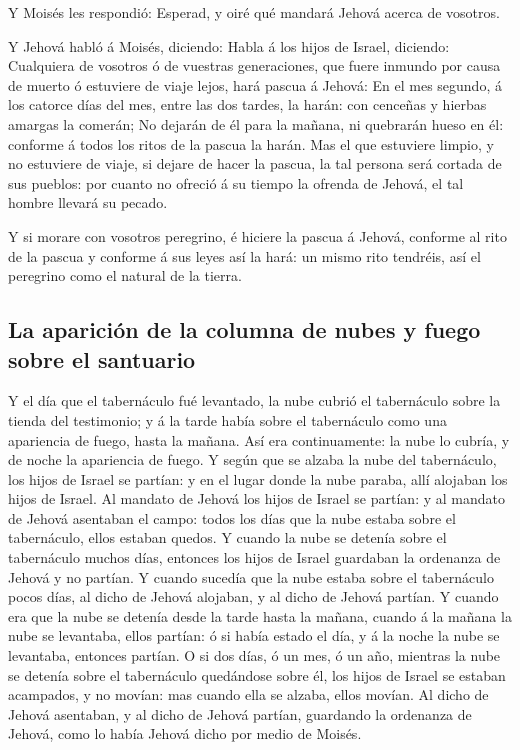  Y Moisés les respondió: Esperad, y oiré qué mandará Jehová
acerca de vosotros.

 Y Jehová habló á Moisés, diciendo:  Habla á
los hijos de Israel, diciendo: Cualquiera de vosotros ó de vuestras
generaciones, que fuere inmundo por causa de muerto ó estuviere de viaje
lejos, hará pascua á Jehová:  En el mes segundo, á los
catorce días del mes, entre las dos tardes, la harán: con cenceñas y
hierbas amargas la comerán;  No dejarán de él para la
mañana, ni quebrarán hueso en él: conforme á todos los ritos de la
pascua la harán.  Mas el que estuviere limpio, y no
estuviere de viaje, si dejare de hacer la pascua, la tal persona será
cortada de sus pueblos: por cuanto no ofreció á su tiempo la ofrenda de
Jehová, el tal hombre llevará su pecado.

 Y si morare con vosotros peregrino, é hiciere la pascua á
Jehová, conforme al rito de la pascua y conforme á sus leyes así la
hará: un mismo rito tendréis, así el peregrino como el natural de la
tierra.

\hypertarget{la-apariciuxf3n-de-la-columna-de-nubes-y-fuego-sobre-el-santuario}{%
\subsection{La aparición de la columna de nubes y fuego sobre el
santuario}\label{la-apariciuxf3n-de-la-columna-de-nubes-y-fuego-sobre-el-santuario}}

 Y el día que el tabernáculo fué levantado, la nube cubrió
el tabernáculo sobre la tienda del testimonio; y á la tarde había sobre
el tabernáculo como una apariencia de fuego, hasta la mañana.
 Así era continuamente: la nube lo cubría, y de noche la
apariencia de fuego.  Y según que se alzaba la nube del
tabernáculo, los hijos de Israel se partían: y en el lugar donde la nube
paraba, allí alojaban los hijos de Israel.  Al mandato de
Jehová los hijos de Israel se partían: y al mandato de Jehová asentaban
el campo: todos los días que la nube estaba sobre el tabernáculo, ellos
estaban quedos.  Y cuando la nube se detenía sobre el
tabernáculo muchos días, entonces los hijos de Israel guardaban la
ordenanza de Jehová y no partían.  Y cuando sucedía que la
nube estaba sobre el tabernáculo pocos días, al dicho de Jehová
alojaban, y al dicho de Jehová partían.  Y cuando era que
la nube se detenía desde la tarde hasta la mañana, cuando á la mañana la
nube se levantaba, ellos partían: ó si había estado el día, y á la noche
la nube se levantaba, entonces partían.  O si dos días, ó
un mes, ó un año, mientras la nube se detenía sobre el tabernáculo
quedándose sobre él, los hijos de Israel se estaban acampados, y no
movían: mas cuando ella se alzaba, ellos movían.  Al dicho
de Jehová asentaban, y al dicho de Jehová partían, guardando la
ordenanza de Jehová, como lo había Jehová dicho por medio de Moisés.

